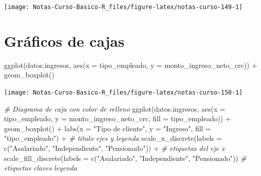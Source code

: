 \documentclass[
  12pt,
]{book}
\newenvironment{Shaded}{\begin{snugshade}}{\end{snugshade}}
\newcommand{\AttributeTok}[1]{\textcolor[rgb]{0.77,0.63,0.00}{#1}}
\newcommand{\CommentTok}[1]{\textcolor[rgb]{0.56,0.35,0.01}{\textit{#1}}}
\newcommand{\FunctionTok}[1]{\textcolor[rgb]{0.00,0.00,0.00}{#1}}
\newcommand{\NormalTok}[1]{#1}
\newcommand{\SpecialCharTok}[1]{\textcolor[rgb]{0.00,0.00,0.00}{#1}}
\newcommand{\StringTok}[1]{\textcolor[rgb]{0.31,0.60,0.02}{#1}}
\begin{document}
\begin{center}\texttt{[image: Notas-Curso-Basico-R\_files/figure-latex/notas-curso-149-1]} \end{center}

\hypertarget{gruxe1ficos-de-cajas}{%
\section{\texorpdfstring{\textbf{Gráficos de cajas}}{Gráficos de cajas}}\label{gruxe1ficos-de-cajas}}

\begin{Shaded}
\begin{Highlighting}[]
\FunctionTok{ggplot}\NormalTok{(datos.ingresos, }\FunctionTok{aes}\NormalTok{(}\AttributeTok{x =}\NormalTok{ tipo\_empleado, }\AttributeTok{y =}\NormalTok{ monto\_ingreso\_neto\_crc)) }\SpecialCharTok{+}
  \FunctionTok{geom\_boxplot}\NormalTok{()}
\end{Highlighting}
\end{Shaded}

\begin{center}\texttt{[image: Notas-Curso-Basico-R\_files/figure-latex/notas-curso-150-1]} \end{center}

\begin{Shaded}
\begin{Highlighting}[]
\CommentTok{\# Diagrama de caja con color de relleno}
\FunctionTok{ggplot}\NormalTok{(datos.ingresos, }\FunctionTok{aes}\NormalTok{(}\AttributeTok{x =}\NormalTok{ tipo\_empleado, }\AttributeTok{y =}\NormalTok{ monto\_ingreso\_neto\_crc, }\AttributeTok{fill =}\NormalTok{ tipo\_empleado))  }\SpecialCharTok{+}
  \FunctionTok{geom\_boxplot}\NormalTok{() }\SpecialCharTok{+}
  \FunctionTok{labs}\NormalTok{(}\AttributeTok{x =} \StringTok{"Tipo de cliente"}\NormalTok{, }\AttributeTok{y =} \StringTok{"Ingreso"}\NormalTok{, }\AttributeTok{fill =} \StringTok{"tipo\_empleado"}\NormalTok{) }\SpecialCharTok{+}   \CommentTok{\# titulo ejes y leyenda}
  \FunctionTok{scale\_x\_discrete}\NormalTok{(}\AttributeTok{labels =} \FunctionTok{c}\NormalTok{(}\StringTok{"Asalariado"}\NormalTok{, }\StringTok{"Independiente"}\NormalTok{, }\StringTok{"Pensionado"}\NormalTok{)) }\SpecialCharTok{+}   \CommentTok{\# etiquetas del eje x}
  \FunctionTok{scale\_fill\_discrete}\NormalTok{(}\AttributeTok{labels =} \FunctionTok{c}\NormalTok{(}\StringTok{"Asalariado"}\NormalTok{, }\StringTok{"Independiente"}\NormalTok{, }\StringTok{"Pensionado"}\NormalTok{))  }\CommentTok{\# etiquetas claves leyenda}
\end{Highlighting}
\end{Shaded}
\end{document}
